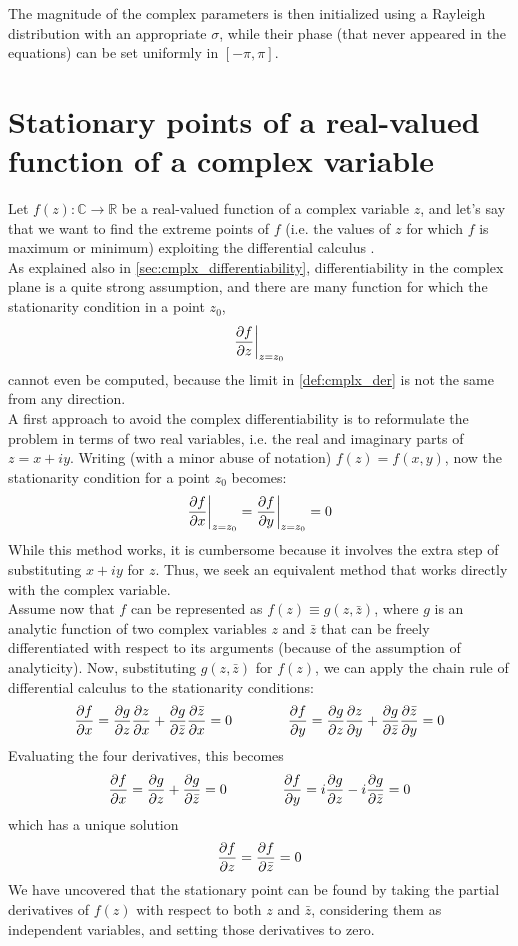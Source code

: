\documentclass[../main.tex]{subfiles}
\begin{document}
The magnitude of the complex parameters is then initialized using a Rayleigh distribution with an appropriate $\sigma$, while their phase (that never appeared in the equations) can be set uniformly in $[-\pi, \pi]$.


\section{Stationary points of a real-valued function of a complex variable}

Let $f(z):\mathds{C}\to\mathds{R}$ be a real-valued function of a complex variable $z$, and let's say that we want to find the extreme points of $f$ (i.e. the values of $z$ for which $f$ is maximum or minimum) exploiting the differential calculus \cite{Messerschmitt_stationary_points}.\\
As explained also in \ref{sec:cmplx_differentiability}, differentiability in the complex plane is a quite strong assumption, and there are many function for which the stationarity condition in a point $z_0$, 
\[ \pdv{f}{z}\bigg|_{z=z_0} \]
cannot even be computed, because the limit in \ref{def:cmplx_der} is not the same from any direction.\\

A first approach to avoid the complex differentiability is to reformulate the problem in terms of two real variables, i.e. the real and imaginary parts of $z = x+iy$. Writing (with a minor abuse of notation) $f(z) = f(x,y)$, now the stationarity condition for a point $z_0$ becomes:
\[ \pdv{f}{x}\bigg|_{z=z_0} = \pdv{f}{y}\bigg|_{z=z_0} = 0 \]
While this method works, it is cumbersome because it involves the extra step of
substituting $x+iy$ for $z$. Thus, we seek an equivalent method that works directly with
the complex variable.\\

Assume now that $f$ can be represented as $f(z)\equiv g(z, \bar{z})$, where $g$ is an analytic function of two complex variables $z$ and $\bar{z}$ that can be freely differentiated with respect to its arguments (because of the assumption of analyticity). Now, substituting $g(z, \bar{z})$ for $f(z)$, we can apply the chain rule of differential calculus to the stationarity conditions:
\[ \pdv{f}{x} = \pdv{g}{z}\pdv{z}{x} + \pdv{g}{\bar{z}}\pdv{\bar{z}}{x} = 0 \qquad\qquad \pdv{f}{y} = \pdv{g}{z}\pdv{z}{y} + \pdv{g}{\bar{z}}\pdv{\bar{z}}{y} = 0 \]
Evaluating the four derivatives, this becomes
\[ \pdv{f}{x} = \pdv{g}{z} + \pdv{g}{\bar{z}} = 0 \qquad\qquad \pdv{f}{y} = i\pdv{g}{z} -i\pdv{g}{\bar{z}} = 0 \]
which has a unique solution
\[ \pdv{f}{z} = \pdv{f}{\bar{z}} = 0 \]
We have uncovered that the stationary point can be found by taking the partial derivatives
of $f(z)$ with respect to both $z$ and $\bar{z}$, considering them as independent variables, and setting
those derivatives to zero.\\
\end{document}
